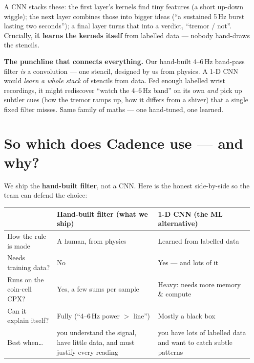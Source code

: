 \documentclass[11pt]{article}
\begin{document}
A CNN stacks these: the first layer's kernels find tiny features (a short
up-down wiggle); the next layer combines those into bigger ideas (``a sustained
5\,Hz burst lasting two seconds''); a final layer turns that into a verdict,
``tremor / not''. Crucially, \textbf{it learns the kernels itself} from labelled
data --- nobody hand-draws the stencils.

\begin{mlbox}
\textbf{The punchline that connects everything.} Our hand-built 4--6\,Hz
band-pass filter \emph{is} a convolution --- one stencil, designed by us from
physics. A 1-D CNN would \emph{learn a whole stack} of stencils from data. Fed
enough labelled wrist recordings, it might rediscover ``watch the 4--6\,Hz
band'' on its own \emph{and} pick up subtler cues (how the tremor ramps up, how
it differs from a shiver) that a single fixed filter misses. Same family of
maths --- one hand-tuned, one learned.
\end{mlbox}

\section{So which does Cadence use --- and why?}

We ship the \textbf{hand-built filter}, not a CNN. Here is the honest
side-by-side so the team can defend the choice:

\begin{center}
\renewcommand{\arraystretch}{1.35}
\begin{tabular}{>{\raggedright\arraybackslash}p{4.3cm}
                >{\raggedright\arraybackslash}p{5.4cm}
                >{\raggedright\arraybackslash}p{5.4cm}}
\toprule
& \textbf{\color{teal}Hand-built filter} \newline (what we ship)
& \textbf{\color{plum}1-D CNN} \newline (the ML alternative)\\
\midrule
How the rule is made & A human, from physics & Learned from labelled data\\
Needs training data?  & No & Yes --- and lots of it\\
Runs on the coin-cell CPX? & Yes, a few sums per sample & Heavy: needs more memory \& compute\\
Can it explain itself?     & Fully (``4--6\,Hz power $>$ line'') & Mostly a black box\\
Best when\dots             & you understand the signal, have little data, and must justify every reading & you have lots of labelled data and want to catch subtle patterns\\
\bottomrule
\end{tabular}
\end{center}
\end{document}
